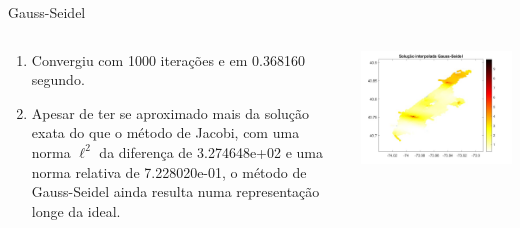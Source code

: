 \documentclass{beamer} %
\theoremstyle{definition}
\begin{document}
    \begin{frame}{Gauss-Seidel}
        \pause
        \begin{columns}
            \begin{column}{0.5\textwidth}
               \begin{enumerate}
                   \item Convergiu com 1000 iterações e em 0.368160 segundo.
                    \pause
                    \item Apesar de ter se aproximado mais da solução exata do que o método de Jacobi, com uma norma $\ell^2$ da diferença de 3.274648e+02 e uma norma relativa de 7.228020e-01, o método de Gauss-Seidel ainda resulta numa representação longe da ideal.
               \end{enumerate} 
            \end{column}
            \begin{column}{0.5\textwidth}
                \pause
                \centering
                \includegraphics[width=\textwidth]{GSinterpol.jpeg}
            \end{column}
        \end{columns}
    \end{frame}
\end{document}
